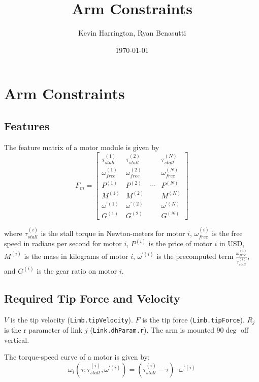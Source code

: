 \documentclass{article}
\title{Arm Constraints}
\author{Kevin Harrington, Ryan Benasutti}
\date{\today}
\begin{document}
\maketitle

\FloatBarrier
\section{Arm Constraints}

\FloatBarrier
\subsection{Features}

The feature matrix of a motor module is given by
\begin{equation}
    F_m =
    \begin{bmatrix}
        \tau_{stall}^{(1)} & \tau_{stall}^{(2)} & & \tau_{stall}^{(N)} \\[6pt]
        \omega_{free}^{(1)} & \omega_{free}^{(2)} & & \omega_{free}^{(N)} \\[6pt]
        P^{(1)} & P^{(2)} & \cdots & P^{(N)} \\[6pt]
        M^{(1)} & M^{(2)} & & M^{(N)} \\[6pt]
        \omega^{\prime (1)} & \omega^{\prime (2)} & & \omega^{\prime (N)} \\[6pt]
        G^{(1)} & G^{(2)} & & G^{(N)}
    \end{bmatrix}
\end{equation}

where $\tau_{stall}^{(i)}$ is the stall torque in Newton-meters for motor $i$,
$\omega_{free}^{(i)}$ is the free speed in radians per second for motor $i$,
$P^{(i)}$ is the price of motor $i$ in USD, $M^{(i)}$ is the mass in kilograms
of motor $i$, $\omega^{\prime (i)}$ is the precomputed term
$\frac{\omega_{free}^{(i)}}{\tau_{stall}^{(i)}}$, and $G^{(i)}$ is the gear
ratio on motor $i$.

\FloatBarrier
\subsection{Required Tip Force and Velocity}

$V$ is the tip velocity (\texttt{Limb.tipVelocity}). $F$ is the tip force
(\texttt{Limb.tipForce}). $R_j$ is the r parameter of link $j$
(\texttt{Link.dhParam.r}). The arm is mounted $90 \deg$ off vertical.

The torque-speed curve of a motor is given by:
\begin{equation}
    \omega_i(\tau; \tau_{stall}^{(i)}, \omega^{\prime (i)}) = (\tau_{stall}^{(i)} - \tau) \cdot \omega^{\prime (i)}
\end{equation}
\end{document}
